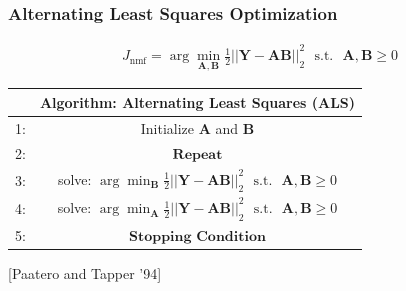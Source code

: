 \documentclass{beamer}
\begin{document}
\begin{frame}
\frametitle{Alternating Least Squares Optimization}

	\begin{align*} 
		J_{\text{nmf}} = \arg\min_{\mathbf{A,B}} {\frac{1}{2}||\mathbf{Y} - \mathbf{A} \mathbf{B}||}_{2}^2  \ \ \    \text{s.t.} \ \ \ \mathbf{A}, \mathbf{B}  \ge 0
	\end{align*}
	
\begin{table}[h]
      \label{tab:ALS} 
\centering
  \begin{tabular}{c || c |  }
        \hline
              & Algorithm: Alternating Least Squares (ALS)\\ \hline \hline
    1: & Initialize  $\mathbf{A}$  and $\mathbf{B}$  \\ \hline
    2: & $\textbf{Repeat}$ \\ \hline
    3: &     solve: $\arg\min_{\mathbf{B}} {\frac{1}{2}||\mathbf{Y} - \mathbf{A} \mathbf{B}||}_{2}^2  \ \ \    \text{s.t.} \ \ \ \mathbf{A}, \mathbf{B}  \ge 0 $ \\  \hline
    4: &     solve: $\arg\min_{\mathbf{A}} {\frac{1}{2}||\mathbf{Y} - \mathbf{A} \mathbf{B}||}_{2}^2  \ \ \    \text{s.t.} \ \ \ \mathbf{A}, \mathbf{B}  \ge 0 $ \\  \hline
    5: & $\textbf{Stopping Condition}$ \\ \hline
    \hline
  \end{tabular}
\end{table}
[Paatero and Tapper '94]

\end{frame}
\end{document}
